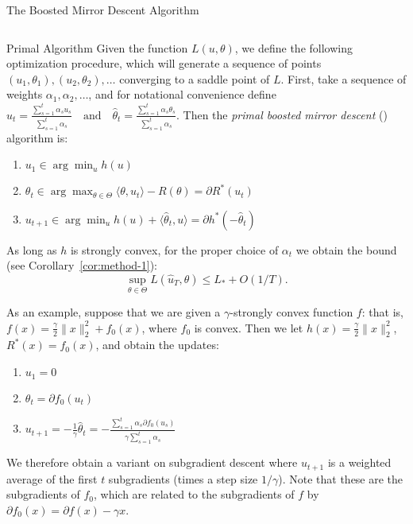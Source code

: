 \documentclass[final]{beamer}
\begin{document}
\begin{frame}{}
\begin{columns}
\begin{column}{0.48\linewidth}
\begin{block}{\large The Boosted Mirror Descent Algorithm}
\begin{columns}[t]
\begin{column}{0.45\linewidth}
\begin{block}{Primal Algorithm}
Given the function $L(u, \theta)$, we define the following 
optimization procedure, which will generate a sequence of 
points $(u_1,\theta_1), (u_2, \theta_2), \ldots$ converging 
to a saddle point of $L$. First, take a sequence of weights
$\alpha_1, \alpha_2, \ldots$, and for notational convenience 
define
\(
\hat{u}_t = \frac{\sum_{s=1}^t \alpha_su_s}{\sum_{s=1}^t \alpha_s} 
\quad \text{and} \quad 
\hat{\theta}_t = \frac{\sum_{s=1}^t \alpha_s\theta_s}{\sum_{s=1}^t \alpha_s}.
\)
Then 
the {\em primal boosted mirror descent} (\primal) algorithm is:
\begin{enumerate}
\item $u_1 \in \arg\min_u h(u)$
\item $\theta_{t} \in \arg\max_{\theta \in \Theta} \langle \theta, u_t \rangle - R(\theta) = \partial R^{*}(u_{t})$
\item $u_{t+1} \in \arg\min_{u} h(u) + \langle \hat{\theta}_t, u \rangle = \partial h^{*}(-\hat\theta_{t})$
\end{enumerate}
As long as $h$ is strongly convex, for the proper choice of $\alpha_{t}$ we 
obtain the bound (see Corollary~\ref{cor:method-1}):
\begin{equation}
\sup_{\theta \in \Theta} L(\hat{u}_T, \theta) \leq L_{*} + O(1/T).
\end{equation}

As an example, suppose that we are given a $\gamma$-strongly convex function 
$f$: that is, $f(x) = \frac{\gamma}{2}\|x\|_2^2 + f_0(x)$, where $f_0$ is convex. 
Then we let $h(x) = \frac{\gamma}{2}\|x\|_2^2$, $R^*(x) = f_0(x)$, and obtain 
the updates:
\begin{enumerate}
\item $u_1 = 0$
\item $\theta_t = \partial f_0(u_t)$
\item $u_{t+1} = -\frac{1}{\gamma}\hat{\theta}_t = -\frac{\sum_{s=1}^t \alpha_s\partial f_0(u_s)}{\gamma \sum_{s=1}^t \alpha_s}$
\end{enumerate}
We therefore obtain a variant on subgradient descent where $u_{t+1}$ 
is a weighted average of the first $t$ subgradients (times a step size 
$1/\gamma$). Note that these are the subgradients of $f_0$, which are related 
to the subgradients of $f$ by $\partial f_0(x) = \partial f(x) - \gamma x$.
\end{block}
\end{column}


\end{columns}
\end{block}
\end{column}
\end{columns}
\end{frame}
\end{document}
